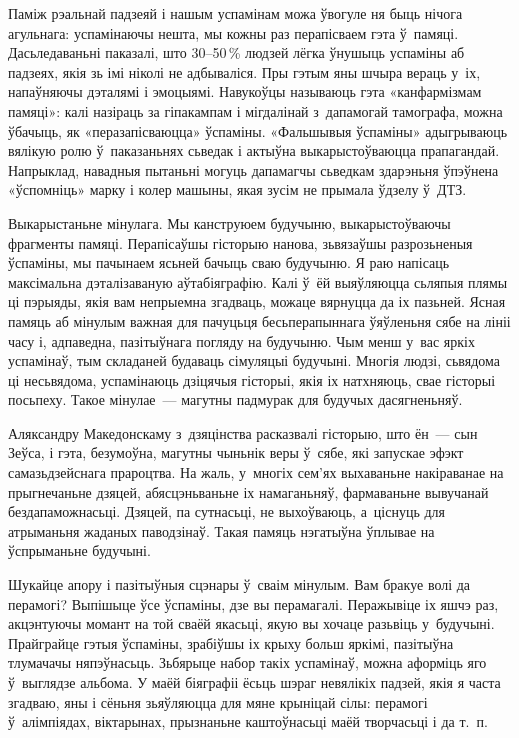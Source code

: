 Паміж рэальнай падзеяй і нашым успамінам можа ўвогуле ня быць нічога агульнага: успамінаючы нешта, мы кожны раз перапісваем гэта ў~памяці. Дасьледаваньні паказалі, што 30--50\,\% людзей лёгка ўнушыць успаміны аб падзеях, якія зь імі ніколі не адбываліся. Пры гэтым яны шчыра вераць у~іх, напаўняючы дэталямі і эмоцыямі. Навукоўцы называюць гэта «канфармізмам памяці»: калі назіраць за гіпакампам і мігдалінай з~дапамогай тамографа, можна ўбачыць, як «перазапісваюцца» ўспаміны. «Фальшывыя ўспаміны» адыгрываюць вялікую ролю ў~паказаньнях сьведак і актыўна выкарыстоўваюцца прапагандай. Напрыклад, навадныя пытаньні могуць дапамагчы сьведкам здарэньня ўпэўнена «ўспомніць» марку і колер машыны, якая зусім не прымала ўдзелу ў~ДТЗ.

Выкарыстаньне мінулага. Мы канструюем будучыню, выкарыстоўваючы фрагменты памяці. Перапісаўшы гісторыю нанова, зьвязаўшы разрозьненыя ўспаміны, мы пачынаем ясьней бачыць сваю будучыню. Я раю напісаць максімальна дэталізаваную аўтабіяграфію. Калі ў~ёй выяўляюцца сьляпыя плямы ці пэрыяды, якія вам непрыемна згадваць, можаце вярнуцца да іх пазьней. Ясная памяць аб мінулым важная для пачуцьця бесьперапыннага ўяўленьня сябе на лініі часу і, адпаведна, пазітыўнага погляду на будучыню. Чым менш у~вас яркіх успамінаў, тым складаней будаваць сімуляцыі будучыні. Многія людзі, сьвядома ці несьвядома, успамінаюць дзіцячыя гісторыі, якія іх натхняюць, свае гісторыі посьпеху. Такое мінулае~--- магутны падмурак для будучых дасягненьняў.

Аляксандру Македонскаму з~дзяцінства расказвалі гісторыю, што ён~--- сын Зеўса, і гэта, безумоўна, магутны чыньнік веры ў~сябе, які запускае эфэкт самазьдзейснага прароцтва. На жаль, у~многіх сем'ях выхаваньне накіраванае на прыгнечаньне дзяцей, абясцэньваньне іх намаганьняў, фармаваньне вывучанай бездапаможнасьці. Дзяцей, па сутнасьці, не выхоўваюць, а~ціснуць для атрыманьня жаданых паводзінаў. Такая памяць нэгатыўна ўплывае на ўспрыманьне будучыні.

Шукайце апору і пазітыўныя сцэнары ў~сваім мінулым. Вам бракуе волі да перамогі? Выпішыце ўсе ўспаміны, дзе вы перамагалі. Перажывіце іх яшчэ раз, акцэнтуючы момант на той сваёй якасьці, якую вы хочаце разьвіць у~будучыні. Прайграйце гэтыя ўспаміны, зрабіўшы іх крыху больш яркімі, пазітыўна тлумачачы няпэўнасьць. Зьбярыце набор такіх успамінаў, можна аформіць яго ў~выглядзе альбома. У маёй біяграфіі ёсьць шэраг невялікіх падзей, якія я часта згадваю, яны і сёньня зьяўляюцца для мяне крыніцай сілы: перамогі ў~алімпіядах, віктарынах, прызнаньне каштоўнасьці маёй творчасьці і да т.~п.

